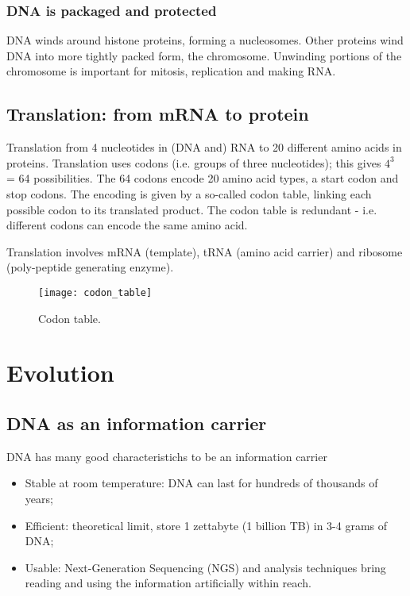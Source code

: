 \subsubsection{DNA is packaged and protected}

DNA winds around histone proteins, forming a nucleosomes. Other proteins wind DNA
into more tightly packed form, the chromosome. Unwinding portions of the
chromosome is important for mitosis, replication and making RNA.

\subsection{Translation: from mRNA to protein}

Translation from 4 nucleotides in (DNA and) RNA to 20 different amino acids in
proteins. Translation uses codons (i.e. groups of three nucleotides); this gives
$4^3$ = 64 possibilities. The 64 codons encode 20 amino acid types, a start codon
and stop codons. The encoding is given by a so-called codon table, linking each
possible codon to its translated product. The codon table is redundant - i.e.
different codons can encode the same amino acid.

Translation involves mRNA (template), tRNA (amino acid carrier) and ribosome
(poly-peptide generating enzyme).

\begin{figure}[!htpb]
\centering
\texttt{[image: codon\_table]}
\caption{Codon table.}
\label{Codon table}
\end{figure}

\section{Evolution}

\subsection{DNA as an information carrier}

DNA has many good characteristichs to be an information carrier

\begin{itemize}
\item Stable at room temperature: DNA can last for hundreds of thousands of
years;
\item Efficient: theoretical limit, store 1 zettabyte (1 billion TB) in 3-4
grams of DNA;
\item Usable: Next-Generation Sequencing (NGS) and analysis techniques bring
reading and using the information artificially within reach.
\end{itemize}

